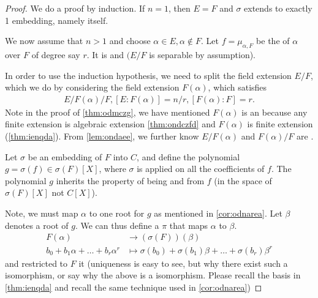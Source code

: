 \documentclass{article}
\begin{document}
\begin{thma}
\begin{figure}[h]


\end{figure}

\end{thma} 
\begin{proof}
We do a proof by induction. If $n=1$, then $E=F$ and $\sigma$ extends to exactly 1 embedding, namely itself.

We now assume that $n>1$ and choose $\alpha \in E, \alpha \notin F$. Let $f=\mu_{\alpha, F}$ be the  of $\alpha$ over $F$ of degree say $r$. It is  and  $(E / F$ is separable by assumption). 

In order to use the induction hypothesis, we need to split the field extension $E / F$, which we do by considering the field extension $F(\alpha)$, which satisfies
\begin{align*}
E / F(\alpha) / F, [E: F(\alpha)]=n / r,[F(\alpha): F]=r .
\end{align*}
Note in the proof of \cref{thm:odmczg}, we have mentioned $F(\alpha)$ is an    because  any finite extension is algebraic extension  \cref{thm:ondczfd} and $F(\alpha)$ is finite extension (\cref{thm:ienqda}). From \cref{lem:ondaee}, we further know $E / F(\alpha)$ and $F(\alpha)/F$ are .

Let $\sigma$ be an embedding of $F$ into $C$, and define the polynomial $g=\sigma(f)\in \sigma(F)[X]$, where $\sigma$ is applied on all the coefficients
of $f$. The polynomial $g$ inherits the property of being  and  from $f$ (in the space of $\sigma(F)[X]$ not $C[X]$). 

Note, we must map $\alpha$ to one root for $g$ as mentioned in \cref{cor:odnarea}. Let $\beta$ denotes a root of $g$.  
We can thus define a   $\pi$ that maps $\alpha$ to $\beta$.
\begin{align*}
F(\alpha) &\rightarrow(\sigma(F))(\beta)\\
b_{0}+b_{1} \alpha+\ldots+b_{r} \alpha^{r} &\mapsto \sigma\left(b_{0}\right)+\sigma\left(b_{1}\right) \beta+\ldots+\sigma\left(b_{r}\right) \beta^{r}
\end{align*}
and restricted to $F$ it  (uniqueness is easy to see, but why there exist such a isomorphism, or say why the above is a isomorphism. Please recall the basis in \cref{thm:ienqda} and recall the same technique used in \cref{cor:odnarea})


\end{proof}
\end{document}
